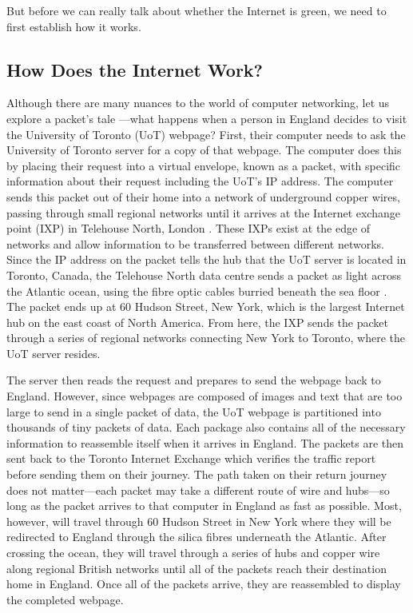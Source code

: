 \documentclass{article}
\begin{document}
But before we can really talk about whether the Internet is green, we need to first establish how it works.

\subsection{How Does the Internet Work?}
Although there are many nuances to the world of computer networking, let us explore a packet's tale \cite{packetstale2013}---what happens when a person in England decides to visit the University of Toronto (UoT) webpage? First, their computer needs to ask the University of Toronto server for a copy of that webpage. The computer does this by placing their request into a virtual envelope, known as a packet, with specific information about their request including the UoT's IP address. The computer sends this packet out of their home into a network of underground copper wires, passing through small regional networks until it arrives at the Internet exchange point (IXP) in Telehouse North, London \cite{mapIXP2021}. These IXPs exist at the edge of networks and allow information to be transferred between different networks. Since the IP address on the packet tells the hub that the UoT server is located in Toronto, Canada, the Telehouse North data centre sends a packet as light across the Atlantic ocean, using the fibre optic cables burried beneath the sea floor \cite{mapsubmarinecables2021}. The packet ends up at 60 Hudson Street, New York, which is the largest Internet hub on the east coast of North America. From here, the IXP sends the packet through a series of regional networks connecting New York to Toronto, where the UoT server resides. 

The server then reads the request and prepares to send the webpage back to England. However, since webpages are composed of images and text that are too large to send in a single packet of data, the UoT webpage is partitioned into thousands of tiny packets of data. Each package also contains all of the necessary information to reassemble itself when it arrives in England. The packets are then sent back to the Toronto Internet Exchange which verifies the traffic report before sending them on their journey. The path taken on their return journey does not matter---each packet may take a different route of wire and hubs---so long as the packet arrives to that computer in England as fast as possible. Most, however, will travel through 60 Hudson Street in New York where they will be redirected to England through the silica fibres underneath the Atlantic. After crossing the ocean, they will travel through a series of hubs and copper wire along regional British networks until all of the packets reach their destination home in England. Once all of the packets arrive, they are reassembled to display the completed webpage. 
\end{document}
